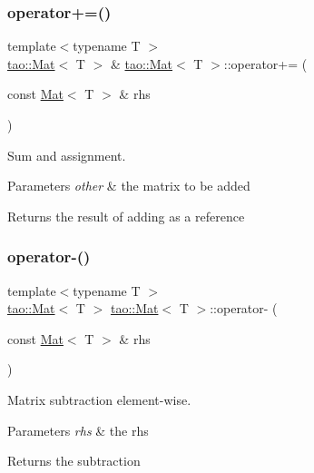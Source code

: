 \subsubsection{\texorpdfstring{operator+=()}{operator+=()}}
{\footnotesize\ttfamily template$<$typename T $>$ \\
\mbox{\hyperlink{classtao_1_1_mat}{tao\+::\+Mat}}$<$ T $>$ \& \mbox{\hyperlink{classtao_1_1_mat}{tao\+::\+Mat}}$<$ T $>$\+::operator+= (\begin{DoxyParamCaption}\item[{const \mbox{\hyperlink{classtao_1_1_mat}{Mat}}$<$ T $>$ \&}]{rhs }\end{DoxyParamCaption})}



Sum and assignment. 


\begin{DoxyParams}{Parameters}
{\em other} & the matrix to be added \\
\hline
\end{DoxyParams}
\begin{DoxyReturn}{Returns}
the result of adding as a reference 
\end{DoxyReturn}
\mbox{\label{classtao_1_1_mat_a05438bfc32bbf1cb404baea6d596d92b}} 
\subsubsection{\texorpdfstring{operator-\/()}{operator-()}\hspace{0.1cm}{\footnotesize\ttfamily [1/2]}}
{\footnotesize\ttfamily template$<$typename T $>$ \\
\mbox{\hyperlink{classtao_1_1_mat}{tao\+::\+Mat}}$<$ T $>$ \mbox{\hyperlink{classtao_1_1_mat}{tao\+::\+Mat}}$<$ T $>$\+::operator-\/ (\begin{DoxyParamCaption}\item[{const \mbox{\hyperlink{classtao_1_1_mat}{Mat}}$<$ T $>$ \&}]{rhs }\end{DoxyParamCaption})}



Matrix subtraction element-\/wise. 


\begin{DoxyParams}{Parameters}
{\em rhs} & the rhs \\
\hline
\end{DoxyParams}
\begin{DoxyReturn}{Returns}
the subtraction 
\end{DoxyReturn}
\mbox{\label{classtao_1_1_mat_a5da0629614bcc00ae6d850a3107e4192}} 
